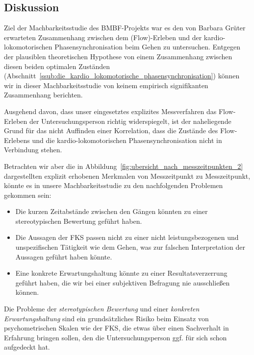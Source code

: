 \subsection{Diskussion} 

\label{sub:diskussion_5_2}

Ziel der Machbarkeitsstudie des \acs{BMBF}-Projekts war es den von Barbara Grüter erwarteten Zusammenhang zwischen dem (Flow)-Erleben und der kardio-lokomotorischen Phasensynchronisation beim Gehen zu untersuchen. Entgegen der plausiblen theoretischen Hypothese von einem Zusammenhang zwischen diesen beiden optimalen Zuständen (Abschnitt~\ref{ssub:die_kardio_lokomotorische_phasensynchronisation}) können wir in dieser Machbarkeitsstudie von keinem empirisch signifikanten Zusammenhang berichten.

Ausgehend davon, dass unser eingesetztes explizites Messverfahren das Flow-Erleben der Untersuchungsperson richtig widerspiegelt, ist der naheliegende Grund für das nicht Auffinden einer Korrelation, dass die Zustände des Flow-Erlebens und die kardio-lokomotorischen Phasensynchronisation nicht in Verbindung stehen.

Betrachten wir aber die in Abbildung~\ref{fig:ubersicht_nach_messzeitpunkten_2} dargestellten explizit erhobenen Merkmalen von Messzeitpunkt zu Messzeitpunkt, könnte es in unsere Machbarkeitsstudie zu den nachfolgenden Problemen gekommen sein: 
\begin{itemize}
	
	\item Die kurzen Zeitabstände zwischen den Gängen könnten zu einer stereotypischen Bewertung geführt haben.
	
	\item Die Aussagen der \ac{FKS} passen nicht zu einer nicht leistungsbezogenen und unspezifischen Tätigkeit wie dem Gehen, was zur falschen Interpretation der Aussagen geführt haben könnte.
	
	\item Eine konkrete Erwartungshaltung könnte zu einer Resultatsverzerrung geführt haben, die wir bei einer subjektiven Befragung nie ausschließen können. 
\end{itemize}

Die Probleme der \emph{stereotypischen Bewertung} und einer \emph{konkreten Erwartungshaltung} sind ein grundsätzliches Risiko beim Einsatz von psychometrischen Skalen wie der \ac{FKS}, die etwas über einen Sachverhalt in Erfahrung bringen sollen, den die Untersuchungsperson ggf. für sich schon aufgedeckt hat.

